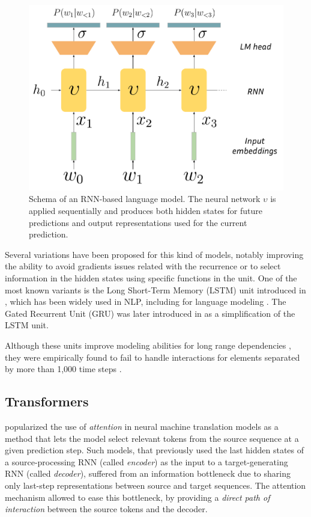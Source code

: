 \begin{figure}
    \centering
    \includegraphics[width=0.5\linewidth]{sources/related_works/imgs/RNN-LM.pdf}
    \caption{Schema of an RNN-based language model. The neural network $\upsilon$ is applied sequentially and produces both hidden states for future predictions and output representations used for the current prediction.}
    \label{fig:token_graph}
\end{figure}

Several variations have been proposed for this kind of models, notably improving the ability to avoid gradients issues related with the recurrence or to select information in the hidden states using specific functions in the unit. One of the most known variants is the Long Short-Term Memory (LSTM) unit introduced in \citet{HochSchm97}, which has been widely used in NLP, including for language modeling \citep{miyamoto-cho-2016-gated}. The Gated Recurrent Unit (GRU) was later introduced in \citet{cho2014learningphraserepresentationsusing} as a simplification of the LSTM unit.

Although these units improve modeling abilities for long range dependencies \citep{rnn_eval}, they were empirically found to fail to handle interactions for elements separated by more than 1,000 time steps \citep{HochSchm97}.

\subsection{Transformers}

\citet{bahdanau_nmt} popularized the use of \textit{attention} in neural machine translation models as a method that lets the model select relevant tokens from the source sequence at a given prediction step. Such models, that previously used the last hidden states of a source-processing RNN (called \textit{encoder}) as the input to a target-generating RNN (called \textit{decoder}), suffered from an information bottleneck due to sharing only last-step representations between source and target sequences. The attention mechanism allowed to ease this bottleneck, by providing a \textit{direct path of interaction} between the source tokens and the decoder.

